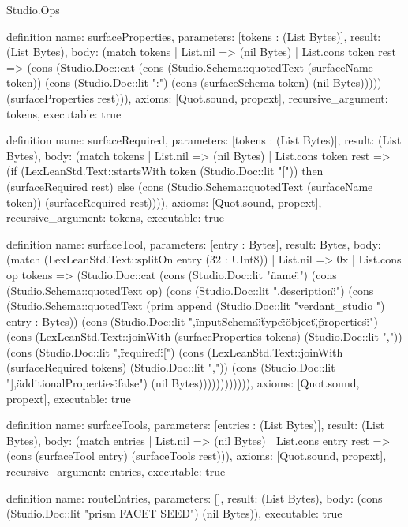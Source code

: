 \begin{lexlean}{Studio.Ops}
\begin{semanticmodule}
{definition{
  name: surfaceProperties,
  parameters: [tokens : (List Bytes)],
  result: (List Bytes),
  body: (match tokens
    | List.nil => (nil Bytes)
    | List.cons token rest => (cons (Studio.Doc::cat (cons (Studio.Schema::quotedText (surfaceName token)) (cons (Studio.Doc::lit ":") (cons (surfaceSchema token) (nil Bytes))))) (surfaceProperties rest))),
  axioms: [Quot.sound, propext],
  recursive_argument: tokens,
  executable: true
}

definition{
  name: surfaceRequired,
  parameters: [tokens : (List Bytes)],
  result: (List Bytes),
  body: (match tokens
    | List.nil => (nil Bytes)
    | List.cons token rest => (if (LexLeanStd.Text::startsWith token (Studio.Doc::lit "[")) then (surfaceRequired rest) else (cons (Studio.Schema::quotedText (surfaceName token)) (surfaceRequired rest)))),
  axioms: [Quot.sound, propext],
  recursive_argument: tokens,
  executable: true
}

definition{
  name: surfaceTool,
  parameters: [entry : Bytes],
  result: Bytes,
  body: (match (LexLeanStd.Text::splitOn entry (32 : UInt8))
    | List.nil => 0x
    | List.cons op tokens => (Studio.Doc::cat (cons (Studio.Doc::lit "{\"name\":") (cons (Studio.Schema::quotedText op) (cons (Studio.Doc::lit ",\"description\":") (cons (Studio.Schema::quotedText (prim append (Studio.Doc::lit "verdant_studio ") entry : Bytes)) (cons (Studio.Doc::lit ",\"inputSchema\":{\"type\":\"object\",\"properties\":{") (cons (LexLeanStd.Text::joinWith (surfaceProperties tokens) (Studio.Doc::lit ",")) (cons (Studio.Doc::lit "},\"required\":[") (cons (LexLeanStd.Text::joinWith (surfaceRequired tokens) (Studio.Doc::lit ",")) (cons (Studio.Doc::lit "],\"additionalProperties\":false}}") (nil Bytes)))))))))))),
  axioms: [Quot.sound, propext],
  executable: true
}

definition{
  name: surfaceTools,
  parameters: [entries : (List Bytes)],
  result: (List Bytes),
  body: (match entries
    | List.nil => (nil Bytes)
    | List.cons entry rest => (cons (surfaceTool entry) (surfaceTools rest))),
  axioms: [Quot.sound, propext],
  recursive_argument: entries,
  executable: true
}

definition{
  name: routeEntries,
  parameters: [],
  result: (List Bytes),
  body: (cons (Studio.Doc::lit "prism FACET SEED") (nil Bytes)),
  executable: true
}

}
\end{semanticmodule}
\end{lexlean}
